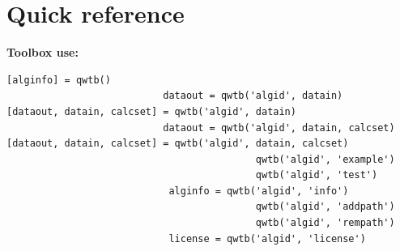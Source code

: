 \documentclass[12pt,a4paper,oneside]{report} %
\begin{document}
\appendix \chapter{Quick reference} %
\newpage
{\small \textbf{Toolbox use:}\\[-1.5em]
\begin{lstlisting}[basicstyle=\small]
                         [alginfo] = qwtb()
                           dataout = qwtb('algid', datain)
[dataout, datain, calcset] = qwtb('algid', datain)
                           dataout = qwtb('algid', datain, calcset)
[dataout, datain, calcset] = qwtb('algid', datain, calcset)
                                           qwtb('algid', 'example')
                                           qwtb('algid', 'test')
                            alginfo = qwtb('algid', 'info')
                                           qwtb('algid', 'addpath')
                                           qwtb('algid', 'rempath')
                            license = qwtb('algid', 'license')
\end{lstlisting}

}
\end{document}
